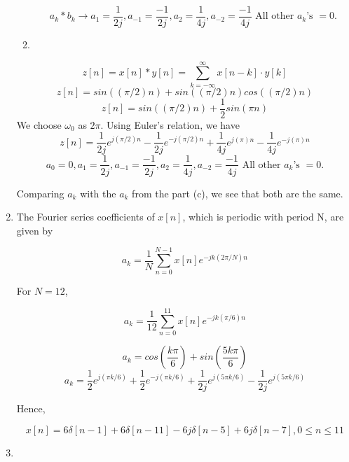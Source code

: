 \documentclass[10pt,a4paper, margin=1in]{article}
\begin{document}
\begin{enumerate}
\begin{enumerate}
    \[ a_k * b_k \xrightarrow{} a_1 = \frac{1}{2j}, a_{-1} = \frac{-1}{2j}, a_2 = \frac{1}{4j},  a_{-2} = \frac{-1}{4j} \text{ All other } a_k \text{'s } = 0. \]
    
    \item %
    \end{enumerate}
    
    \[ z[n] = x[n] * y[n] = \sum_{k=-\infty}^{\infty} x[n - k] \cdot y[k] \]
    \[ z[n] = sin((\pi/2)n) + sin((\pi/2)n)cos((\pi/2)n) \]
    \[ z[n] = sin((\pi/2)n) + \frac{1}{2} sin(\pi n) \]
    We choose $\omega_0$ as $2\pi$. Using Euler's relation, we have
    \[ z[n] = \frac{1}{2j} e^{j(\pi/2)n} - \frac{1}{2j} e^{-j(\pi/2)n} + \frac{1}{4j} e^{j(\pi)n} - \frac{1}{4j} e^{-j(\pi)n} \]
    \[ a_0 = 0, a_1 = \frac{1}{2j}, a_{-1} = \frac{-1}{2j}, a_2 = \frac{1}{4j}, a_{-2} = \frac{-1}{4j} \text{ All other } a_k \text{'s } = 0. \]
    
    Comparing $a_k$ with the $a_k$ from the part (c), we see that both are the same.
    

\item %

The Fourier series coefficients of $x[n]$, which is periodic with period N, are given by

\[ a_k = \frac{1}{N} \sum_{n=0}^{N-1} x[n] e^{-jk(2\pi / N) n} \]

For $N = 12$,

\[ a_k = \frac{1}{12} \sum_{n=0}^{11} x[n] e^{-jk(\pi / 6) n} \]

\[ a_k = cos(\frac{k\pi}{6}) + sin(\frac{5k\pi}{6})\]
\[ a_k = \frac{1}{2} e^{j(\pi k / 6)} + \frac{1}{2} e^{-j(\pi k / 6)} + \frac{1}{2j} e^{j(5\pi k / 6)} - \frac{1}{2j} e^{j(5\pi k / 6)}\]

Hence,

\[ x[n] = 6 \delta [n-1] + 6 \delta [n-11] - 6j \delta [n-5] + 6j \delta [n-7], 0 \leq n \leq 11 \]

\item %
    \begin{enumerate}


\end{enumerate}
\end{enumerate}
\end{document}
